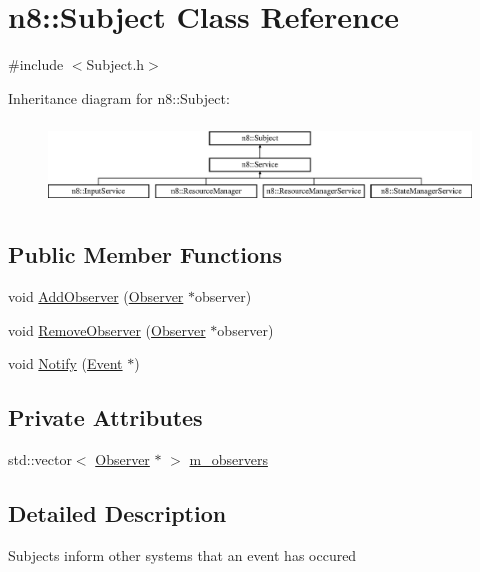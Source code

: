 \hypertarget{classn8_1_1_subject}{\section{n8\-:\-:Subject Class Reference}
\label{classn8_1_1_subject}
}


{\ttfamily \#include $<$Subject.\-h$>$}

Inheritance diagram for n8\-:\-:Subject\-:\begin{figure}[H]
\begin{center}
\leavevmode
\includegraphics[height=2.222222cm]{classn8_1_1_subject}
\end{center}
\end{figure}
\subsection*{Public Member Functions}
\begin{DoxyCompactItemize}
\item 
void \hyperlink{classn8_1_1_subject_ae12efefe6756166c1521b06db8f633ff}{Add\-Observer} (\hyperlink{classn8_1_1_observer}{Observer} $\ast$observer)
\item 
void \hyperlink{classn8_1_1_subject_a652c26127339aeaf34ccfff6d12ceb64}{Remove\-Observer} (\hyperlink{classn8_1_1_observer}{Observer} $\ast$observer)
\item 
void \hyperlink{classn8_1_1_subject_a74e8ccf2447a062f605ffecefadae2ca}{Notify} (\hyperlink{classn8_1_1_event}{Event} $\ast$)
\end{DoxyCompactItemize}
\subsection*{Private Attributes}
\begin{DoxyCompactItemize}
\item 
std\-::vector$<$ \hyperlink{classn8_1_1_observer}{Observer} $\ast$ $>$ \hyperlink{classn8_1_1_subject_adaf1d665557715d9d22826c59f5fa496}{m\-\_\-observers}
\end{DoxyCompactItemize}


\subsection{Detailed Description}
Subjects inform other systems that an event has occured 

